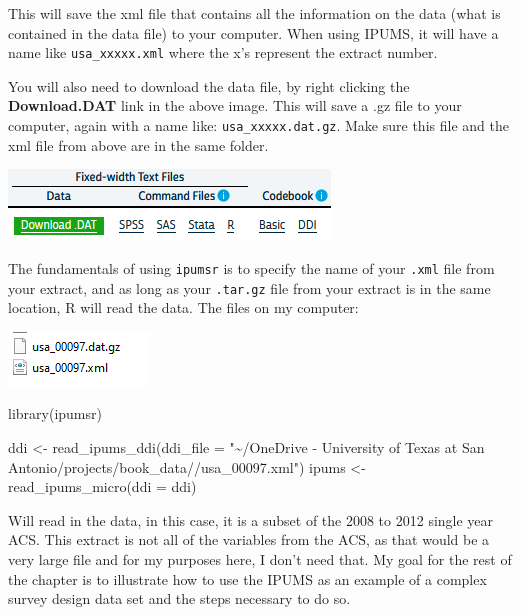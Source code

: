 \documentclass[
]{article}
\newenvironment{Shaded}{\begin{snugshade}}{\end{snugshade}}
\newcommand{\AttributeTok}[1]{\textcolor[rgb]{0.77,0.63,0.00}{#1}}
\newcommand{\FunctionTok}[1]{\textcolor[rgb]{0.00,0.00,0.00}{#1}}
\newcommand{\NormalTok}[1]{#1}
\newcommand{\OtherTok}[1]{\textcolor[rgb]{0.56,0.35,0.01}{#1}}
\newcommand{\StringTok}[1]{\textcolor[rgb]{0.31,0.60,0.02}{#1}}
\begin{document}
This will save the xml file that contains all the information on the data (what is contained in the data file) to your computer. When using IPUMS, it will have a name like \texttt{usa\_xxxxx.xml} where the x's represent the extract number.

You will also need to download the data file, by right clicking the \textbf{Download.DAT} link in the above image. This will save a .gz file to your computer, again with a name like: \texttt{usa\_xxxxx.dat.gz}. Make sure this file and the xml file from above are in the same folder.

\includegraphics{images/impum1.png}

The fundamentals of using \texttt{ipumsr} is to specify the name of your \texttt{.xml} file from your extract, and as long as your \texttt{.tar.gz} file from your extract is in the same location, R will read the data. The files on my computer:

\includegraphics{images/ipums_files.png}

\begin{Shaded}
\begin{Highlighting}[]
\FunctionTok{library}\NormalTok{(ipumsr)}

\NormalTok{ddi }\OtherTok{\textless{}{-}} \FunctionTok{read\_ipums\_ddi}\NormalTok{(}\AttributeTok{ddi\_file =} \StringTok{"\textasciitilde{}/OneDrive {-} University of Texas at San Antonio/projects/book\_data//usa\_00097.xml"}\NormalTok{)}
\NormalTok{ipums }\OtherTok{\textless{}{-}} \FunctionTok{read\_ipums\_micro}\NormalTok{(}\AttributeTok{ddi =}\NormalTok{ ddi)}
\end{Highlighting}
\end{Shaded}

Will read in the data, in this case, it is a subset of the 2008 to 2012 single year ACS. This extract is not all of the variables from the ACS, as that would be a very large file and for my purposes here, I don't need that. My goal for the rest of the chapter is to illustrate how to use the IPUMS as an example of a complex survey design data set and the steps necessary to do so.
\end{document}
